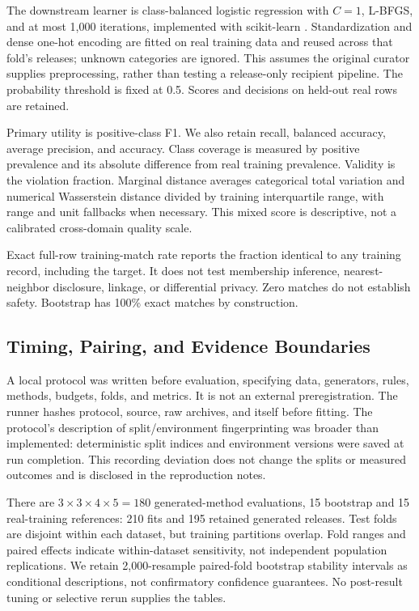 \documentclass{svproc}
\begin{document}
The downstream learner is class-balanced logistic regression with $C=1$, L-BFGS, and at most 1,000 iterations, implemented with scikit-learn \cite{sklearn}. Standardization and dense one-hot encoding are fitted on real training data and reused across that fold's releases; unknown categories are ignored. This assumes the original curator supplies preprocessing, rather than testing a release-only recipient pipeline. The probability threshold is fixed at 0.5. Scores and decisions on held-out real rows are retained.

Primary utility is positive-class F1. We also retain recall, balanced accuracy, average precision, and accuracy. Class coverage is measured by positive prevalence and its absolute difference from real training prevalence. Validity is the violation fraction. Marginal distance averages categorical total variation and numerical Wasserstein distance divided by training interquartile range, with range and unit fallbacks when necessary. This mixed score is descriptive, not a calibrated cross-domain quality scale.

Exact full-row training-match rate reports the fraction identical to any training record, including the target. It does not test membership inference, nearest-neighbor disclosure, linkage, or differential privacy. Zero matches do not establish safety. Bootstrap has 100\% exact matches by construction.

\subsection{Timing, Pairing, and Evidence Boundaries}
A local protocol was written before evaluation, specifying data, generators, rules, methods, budgets, folds, and metrics. It is not an external preregistration. The runner hashes protocol, source, raw archives, and itself before fitting. The protocol's description of split/environment fingerprinting was broader than implemented: deterministic split indices and environment versions were saved at run completion. This recording deviation does not change the splits or measured outcomes and is disclosed in the reproduction notes.

There are $3\times3\times4\times5=180$ generated-method evaluations, 15 bootstrap and 15 real-training references: 210 fits and 195 retained generated releases. Test folds are disjoint within each dataset, but training partitions overlap. Fold ranges and paired effects indicate within-dataset sensitivity, not independent population replications. We retain 2,000-resample paired-fold bootstrap stability intervals as conditional descriptions, not confirmatory confidence guarantees. No post-result tuning or selective rerun supplies the tables.
\end{document}
